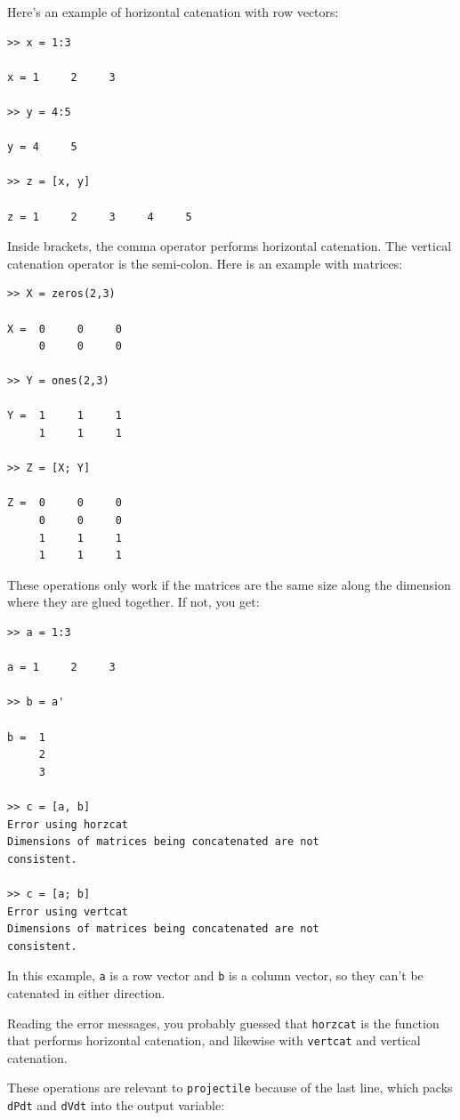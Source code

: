 \documentclass{book}
\begin{document}
Here's an example of horizontal catenation with row vectors:

\begin{verbatim}
>> x = 1:3

x = 1     2     3

>> y = 4:5

y = 4     5

>> z = [x, y]

z = 1     2     3     4     5
\end{verbatim}

Inside brackets, the comma operator performs horizontal catenation.
The vertical catenation operator is the semi-colon.  Here is an
example with matrices:

\begin{verbatim}
>> X = zeros(2,3)

X =  0     0     0
     0     0     0

>> Y = ones(2,3)

Y =  1     1     1
     1     1     1

>> Z = [X; Y]

Z =  0     0     0
     0     0     0
     1     1     1
     1     1     1
\end{verbatim}

These operations only work if the matrices are the same size along
the dimension where they are glued together.  If not, you get:

\begin{verbatim}
>> a = 1:3

a = 1     2     3

>> b = a'

b =  1
     2
     3

>> c = [a, b]
Error using horzcat
Dimensions of matrices being concatenated are not
consistent.

>> c = [a; b]
Error using vertcat
Dimensions of matrices being concatenated are not
consistent.
\end{verbatim}

In this example, {\tt a} is a row vector and {\tt b} is a column
vector, so they can't be catenated in either direction.

Reading the error messages, you probably guessed that {\tt horzcat}
is the function that performs horizontal catenation, and likewise
with {\tt vertcat} and vertical catenation.

These operations are relevant to {\tt projectile} because of the
last line, which packs {\tt dPdt} and {\tt dVdt} into the
output variable:
\end{document}
